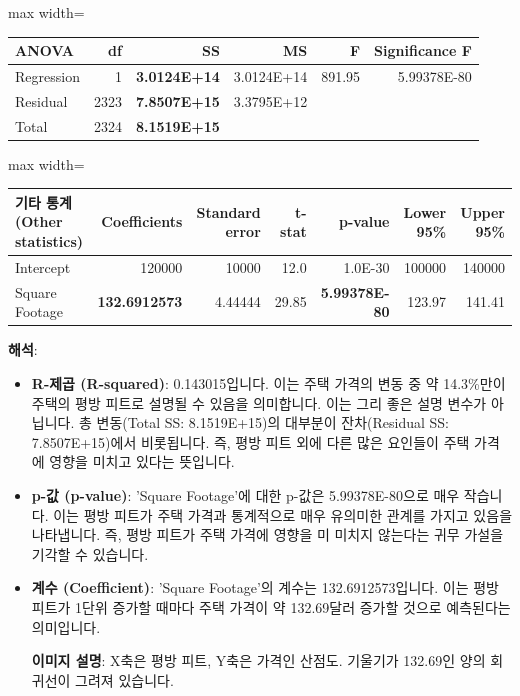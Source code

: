 \documentclass[11pt,a4paper]{book}
\theoremstyle{definition}
\begin{document}
\begin{tcolorbox}[examplebox, title={Excel 실습: Zillow 주택 데이터}]
\begin{adjustbox}{max width=\textwidth}
\begin{tabular}{lrrrrr}
\toprule
\textbf{ANOVA} & \textbf{df} & \textbf{SS} & \textbf{MS} & \textbf{F} & \textbf{Significance F} \\
\midrule
Regression & 1 & \textbf{3.0124E+14} & 3.0124E+14 & 891.95 & 5.99378E-80 \\
Residual & 2323 & \textbf{7.8507E+15} & 3.3795E+12 & & \\
Total & 2324 & \textbf{8.1519E+15} & & & \\
\bottomrule
\end{tabular}
\end{adjustbox}

\begin{adjustbox}{max width=\textwidth}
\begin{tabular}{lrrrrrr}
\toprule
\textbf{기타 통계 (Other statistics)} & \textbf{Coefficients} & \textbf{Standard error} & \textbf{t-stat} & \textbf{p-value} & \textbf{Lower 95\%} & \textbf{Upper 95\%} \\
\midrule
Intercept & 120000 & 10000 & 12.0 & 1.0E-30 & 100000 & 140000 \\
Square Footage & \textbf{132.6912573} & 4.44444 & 29.85 & \textbf{5.99378E-80} & 123.97 & 141.41 \\
\bottomrule
\end{tabular}
\end{adjustbox}

\textbf{해석}:
\begin{itemize}
    \item \textbf{R-제곱 (R-squared)}: 0.143015입니다. 이는 주택 가격의 변동 중 약 14.3\%만이 주택의 평방 피트로 설명될 수 있음을 의미합니다. 이는 그리 좋은 설명 변수가 아닙니다. 총 변동(Total SS: 8.1519E+15)의 대부분이 잔차(Residual SS: 7.8507E+15)에서 비롯됩니다. 즉, 평방 피트 외에 다른 많은 요인들이 주택 가격에 영향을 미치고 있다는 뜻입니다.

    \item \textbf{p-값 (p-value)}: 'Square Footage'에 대한 p-값은 5.99378E-80으로 매우 작습니다. 이는 평방 피트가 주택 가격과 통계적으로 매우 유의미한 관계를 가지고 있음을 나타냅니다. 즉, 평방 피트가 주택 가격에 영향을 미 미치지 않는다는 귀무 가설을 기각할 수 있습니다.

    \item \textbf{계수 (Coefficient)}: 'Square Footage'의 계수는 132.6912573입니다. 이는 평방 피트가 1단위 증가할 때마다 주택 가격이 약 132.69달러 증가할 것으로 예측된다는 의미입니다.
    \begin{center}
    \end{center}
    \textbf{이미지 설명}: X축은 평방 피트, Y축은 가격인 산점도. 기울기가 132.69인 양의 회귀선이 그려져 있습니다.


\end{itemize}
\end{tcolorbox}
\end{document}
